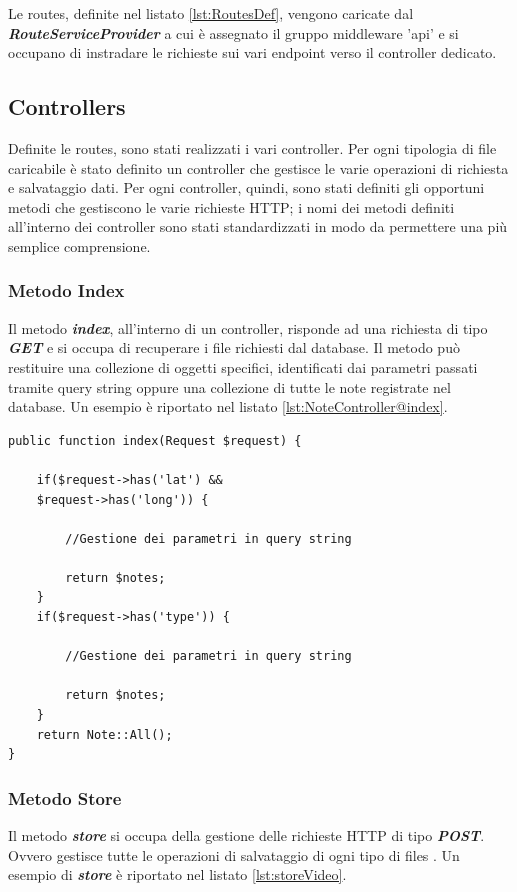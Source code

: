Le routes, definite nel listato \ref{lst:RoutesDef}, vengono caricate dal \textit{\textbf{RouteServiceProvider}} a cui è assegnato il gruppo middleware 'api' e si occupano di instradare le richieste sui vari endpoint verso il controller dedicato.

\subsection{Controllers}

Definite le routes, sono stati realizzati i vari controller. Per ogni tipologia di file caricabile è stato definito un controller che gestisce le varie operazioni di richiesta e salvataggio dati.
Per ogni controller, quindi, sono stati definiti gli opportuni metodi che gestiscono le varie richieste HTTP;
i nomi dei metodi definiti all'interno dei controller sono stati standardizzati in modo da permettere una più semplice comprensione.

\pagebreak
\subsubsection{Metodo Index}
Il metodo \textit{\textbf{index}}, all'interno di un controller, risponde ad una richiesta di tipo \textit{\textbf{GET}} e si occupa di recuperare i file richiesti dal database. Il metodo può restituire una collezione di oggetti specifici, identificati dai parametri passati tramite query string oppure una collezione di tutte le note registrate nel database. Un esempio è riportato nel listato \ref{lst:NoteController@index}.

\begin{lstlisting}[caption={Funzione \textit{\textbf{index}} del controller NoteController},label={lst:NoteController@index}]
public function index(Request $request) {
	
	if($request->has('lat') &&
	$request->has('long')) {
	
		//Gestione dei parametri in query string
		
		return $notes;
	}
	if($request->has('type')) {

		//Gestione dei parametri in query string	
		
		return $notes;
	}
	return Note::All();
}
\end{lstlisting}

\subsubsection{Metodo Store}
Il metodo \textit{\textbf{store}} si occupa della gestione delle richieste HTTP di tipo \textit{\textbf{POST}}. 
Ovvero gestisce tutte le operazioni di salvataggio di ogni tipo di files \citep{rif2}\citep{rif4}.
Un esempio di \textit{\textbf{store}} è riportato nel listato \ref{lst:storeVideo}.


